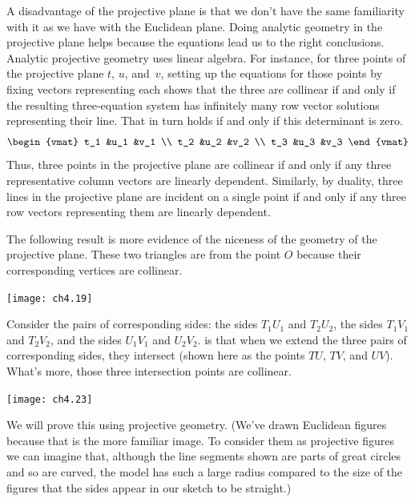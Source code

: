 A disadvantage of the projective plane is that we don't have the 
same familiarity with it as we have with the Euclidean plane.
Doing analytic geometry in the projective plane helps 
because the equations lead us to the right conclusions.
Analytic projective geometry uses linear algebra.
For instance, for three points of the projective plane
$t$, $u$, and~$v$, 
setting up the equations for those points by fixing vectors representing each
shows that the three are collinear if and only if the resulting three-equation
system has infinitely many row vector solutions
representing their line.
That in turn holds if and only if this determinant is zero.
\begin{equation*}
  \begin{vmat}
    t_1  &u_1  &v_1  \\
    t_2  &u_2  &v_2  \\
    t_3  &u_3  &v_3  
  \end{vmat}
\end{equation*}
Thus, three points in the projective plane are collinear if and only if
any three representative column vectors are linearly dependent.
Similarly, by duality, 
three lines in the projective plane are incident on a single
point if and only if any three row vectors representing them are linearly
dependent.

The following result is more evidence of the niceness
of the geometry of the projective plane.
These two triangles are
 from the point $O$ 
because their corresponding vertices are collinear.
\begin{center}
  \texttt{[image: ch4.19]}
\end{center}
Consider the pairs of corresponding sides:
the sides $T_1U_1$ and $T_2U_2$, 
the sides $T_1V_1$ and $T_2V_2$, 
and the sides $U_1V_1$ and $U_2V_2$.
is that when we extend the three pairs of corresponding 
sides, they intersect
(shown here as the points $TU$, $TV$, and $UV$).
What's more, those three intersection points are collinear.
\begin{center}
  \texttt{[image: ch4.23]}
\end{center}
We will prove this using projective geometry.
(We've drawn Euclidean figures because that is the more familiar image.
To consider them as projective figures
we can imagine that, although the line segments shown are parts of great 
circles and so are curved,
the model has such a large radius compared to the size of the 
figures that the sides appear in our sketch to be straight.)


